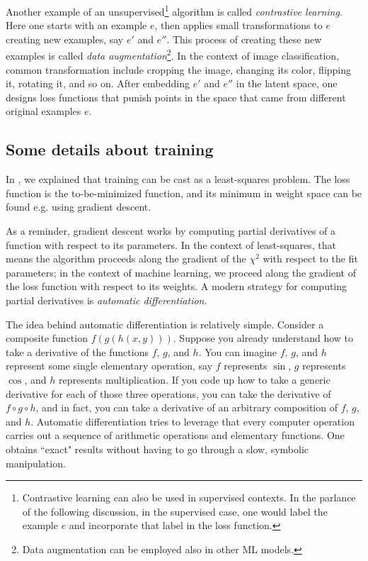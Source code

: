 Another example of an unsupervised\footnote{Contrastive learning can also
be used in supervised contexts. In the parlance of the following discussion,
in the supervised case, one would label the example $e$ and incorporate
that label in the loss function.} algorithm is called {\it contrastive
learning}. Here one starts with an example $e$,
then applies small transformations to $e$ creating new examples, say $e'$ and
$e''$. This process of creating these new examples is called {\it data
augmentation}\footnote{Data augmentation can be
employed also in other ML models.}. 
In the context of image classification,
common transformation include cropping the image, changing its color, flipping
it, rotating it, and so on. 
After embedding $e'$ and $e''$ in the latent space, one designs loss functions
that punish points in the space that came from different original examples $e$.

\subsection{Some details about training}

In , we explained that training can be cast as a least-squares
problem. The loss function is the to-be-minimized function, and its minimum
in weight space can be found e.g. using gradient descent.

As a reminder, gradient descent works by computing partial derivatives of 
a function with respect to its parameters. In the context of least-squares, that
means the algorithm proceeds along the gradient of the $\chi^2$ with respect
to the fit parameters; in the context of machine learning, we proceed along the
gradient of the loss function with respect to its weights. A modern strategy for
computing partial derivatives is {\it automatic differentiation}.

The idea behind automatic differentiation is relatively simple. Consider a composite
function $f(g(h(x,y)))$. Suppose you already understand how to take a derivative
of the functions $f$, $g$, and $h$. You can imagine $f$, $g$, and $h$ represent
some single elementary operation, say $f$ represents $\sin$, $g$ represents
$\cos$, and $h$ represents multiplication. If you code up how to take a generic
derivative for each of those three operations, you can take the derivative of
$f\circ g\circ h$, and in fact, you can take a derivative of an arbitrary
composition of $f$, $g$, and $h$. Automatic differentiation tries to leverage
that every computer operation carries out a sequence of arithmetic operations
and elementary functions. One obtains ``exact" results without having to go
through a slow, symbolic manipulation.

